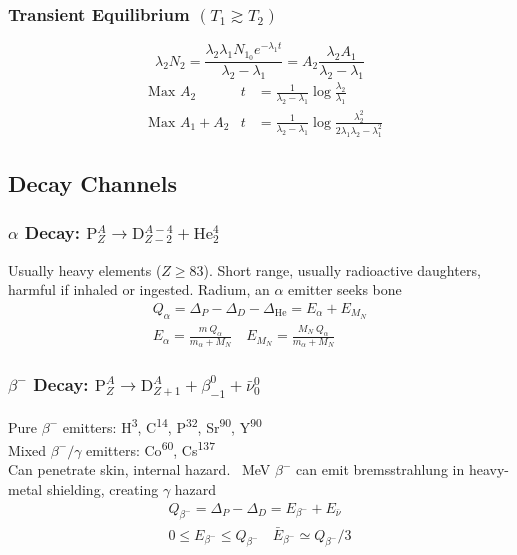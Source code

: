 \subsubsection{Transient Equilibrium $(T_1 \gtrsim T_2)$}
\[ \lambda_2 N_2 = \frac{\lambda_2 \lambda_1 N_{1_0} e^{-\lambda_1 t}}{\lambda_2 - \lambda_1} = A_2 \frac{\lambda_2 A_1}{\lambda_2 - \lambda_1} \]
\begin{align*}
& \text{Max } A_2 & t &= \frac{1}{\lambda_2 - \lambda_1} \log{\frac{\lambda_2}{\lambda_1}} \\
& \text{Max } A_1 + A_2 & t &= \frac{1}{\lambda_2 - \lambda_1} \log{\frac{\lambda^2_2}{2\lambda_1\lambda_2 - \lambda^2_1}}
\end{align*}

\subsection{Decay Channels}

\subsubsection{$\alpha$ Decay: \textnormal{$\text{P}^A_Z \rightarrow \text{D}^{A-4}_{Z-2} + \text{He}^4_2$}}

Usually heavy elements ($Z \geq 83$). Short range, usually radioactive daughters, harmful if inhaled or ingested. Radium, an $\alpha$ emitter seeks bone
\begin{gather*}
Q_\alpha = \Delta_P - \Delta_D - \Delta_{\text{He}} = E_\alpha + E_{M_N} \\
E_\alpha = \frac{m~Q_\alpha }{m_\alpha + M_N} \quad E_{M_N} = \frac{M_N~Q_\alpha}{m_\alpha + M_N}
\end{gather*}

\subsubsection{$\beta^-$ Decay: \textnormal{$\text{P}^A_Z \rightarrow \text{D}^A_{Z+1} + \beta^0_{-1} + \bar{\nu}^0_0$}}

Pure $\beta^-$ emitters: H\textsuperscript{3}, C\textsuperscript{14}, P\textsuperscript{32}, Sr\textsuperscript{90}, Y\textsuperscript{90} \\
Mixed $\beta^- / \gamma$ emitters: Co\textsuperscript{60}, Cs\textsuperscript{137} \\
Can penetrate skin, internal hazard. \SI{}{\mega\electronvolt} $\beta^-$ can emit bremsstrahlung in heavy-metal shielding, creating $\gamma$ hazard
\begin{gather*}
Q_{\beta^-} = \Delta_P - \Delta_D = E_{\beta^-} + E_{\bar{\nu}} \\
0 \leq E_{\beta^-} \leq Q_{\beta^-} \quad \bar{E}_{\beta^-} \simeq Q_{\beta^-} / 3
\end{gather*}

